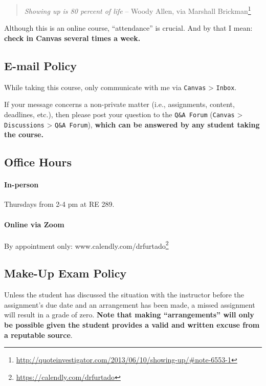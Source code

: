\documentclass[
  letterpaper,
  DIV=11,
  numbers=noendperiod]{scrartcl}
\let\oldparagraph\paragraph
\renewcommand{\paragraph}[1]{\oldparagraph{#1}\mbox{}}
\DeclareRobustCommand{\href}[2]{#2\footnote{\url{#1}}}
\begin{document}
\begin{quote}
\emph{Showing up is 80 percent of life} -- Woody Allen,
\href{http://quoteinvestigator.com/2013/06/10/showing-up/\#note-6553-1}{via
Marshall Brickman}
\end{quote}

Although this is an online course, ``attendance'' is crucial. And by
that I mean: \textbf{check in Canvas several times a week.}

\hypertarget{e-mail-policy}{%
\subsection{E-mail Policy}\label{e-mail-policy}}

While taking this course, only communicate with me via \texttt{Canvas}
\textgreater{} \texttt{Inbox}.

If your message concerns a non-private matter (i.e., assignments,
content, deadlines, etc.), then please post your question to the
\texttt{Q\&A\ Forum} (\texttt{Canvas} \textgreater{}
\texttt{Discussions} \textgreater{} \texttt{Q\&A\ Forum}), \textbf{which
can be answered by any student taking the course.}

\hypertarget{sec-office-hours}{%
\subsection{Office Hours}\label{sec-office-hours}}

\hypertarget{in-person}{%
\paragraph{In-person}\label{in-person}}

Thursdays from 2-4 pm at RE 289.

\hypertarget{online-via-zoom}{%
\paragraph{Online via Zoom}\label{online-via-zoom}}

By appointment only:
\href{https://calendly.com/drfurtado}{www.calendly.com/drfurtado}

\hypertarget{make-up-exam-policy}{%
\subsection{Make-Up Exam Policy}\label{make-up-exam-policy}}

Unless the student has discussed the situation with the instructor
before the assignment's due date and an arrangement has been made, a
missed assignment will result in a grade of zero. \textbf{Note that
making ``arrangements'' will only be possible given the student provides
a valid and written excuse from a reputable source}.
\end{document}
